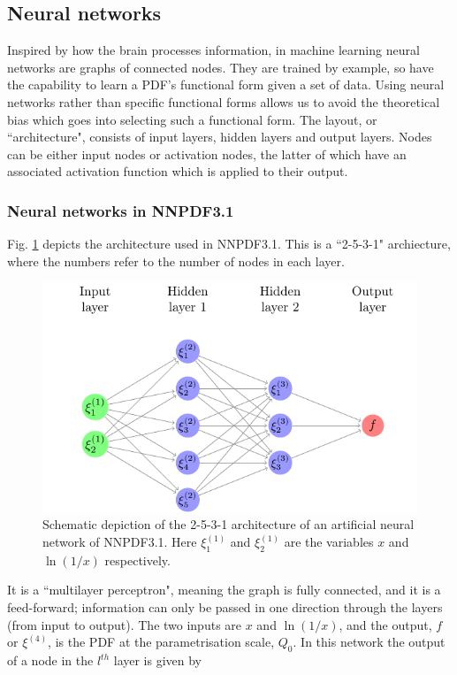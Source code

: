 \subsection{Neural networks}

Inspired by how the brain processes information, in machine learning neural networks are graphs of connected nodes. They are trained by example, so
have the capability to learn a PDF's functional form given a set of data. Using neural networks rather than specific functional forms allows us to avoid the theoretical bias which goes into selecting such a functional form. The layout, or ``architecture", consists
of input layers, hidden layers and output layers. Nodes can be either input nodes or activation nodes, the latter of which have an associated activation function which is applied to their output. 
\subsubsection{Neural networks in NNPDF3.1}
Fig. \ref{fig:nn} depicts the architecture used in NNPDF3.1. This is a ``2-5-3-1" archiecture, where the numbers refer to the number of nodes in each layer. 
\begin{figure}[h]
\centering
\includegraphics[width=\textwidth]{../diagrams/neuralnet.pdf}
\caption{Schematic depiction of the 2-5-3-1 architecture of an artificial neural network of NNPDF3.1. Here $\xi_1^{(1)}$ and $\xi_2^{(1)}$ are the variables $x$ and $\ln (1/x)$ respectively. \label{fig:nn}}
\end{figure}
It is a ``multilayer perceptron", meaning the graph is fully connected, and it is a feed-forward; information can only be passed in one direction through the layers (from 
input to output). The two inputs are $x$ and $\ln (1/x)$, and the output, $f$ or $\xi^{(4)}$, is the PDF at the parametrisation scale, $Q_0$. In this network the output of a node in the $l^{th}$ layer is given by
